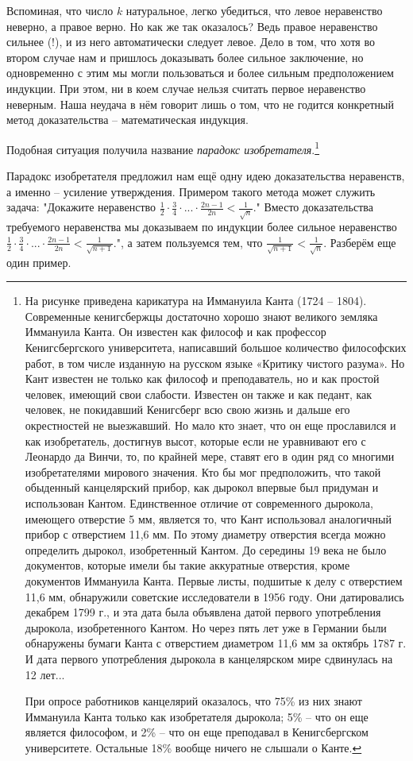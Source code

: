 Вспоминая, что число $k$ натуральное, легко убедиться, что левое неравенство неверно, а правое верно. Но как же так оказалось? Ведь правое неравенство сильнее (!), и из него автоматически следует левое. Дело в том, что хотя во втором случае нам и пришлось доказывать более сильное заключение, но одновременно с этим мы могли пользоваться и более сильным предположением индукции. При этом, ни в коем случае нельзя считать первое неравенство неверным. Наша неудача в нём говорит лишь о том, что не годится конкретный метод доказательства – математическая индукция. 
\par
Подобная ситуация получила название \textit{парадокс изобретателя}.\footnote{На рисунке приведена карикатура на Иммануила Канта (1724 – 1804). Современные кенигсбержцы достаточно хорошо знают великого земляка Иммануила Канта. Он известен как философ и как профессор Кенигсбергского университета, написавший большое количество философских работ, в том числе изданную на русском языке «Критику чистого разума».
Но Кант известен не только как философ и преподаватель, но и как простой человек, имеющий свои слабости. Известен он также и как педант, как человек, не покидавший Кенигсберг всю свою жизнь и дальше его окрестностей не выезжавший. Но мало кто знает, что он еще прославился и как изобретатель, достигнув высот, которые если не уравнивают его с Леонардо да Винчи, то, по крайней мере, ставят его в один ряд со многими изобретателями мирового значения. Кто бы мог предположить, что такой обыденный канцелярский прибор, как дырокол впервые был придуман и использован Кантом. Единственное отличие от современного дырокола, имеющего отверстие 5 мм, является то, что Кант использовал аналогичный прибор с отверстием 11,6 мм. По этому диаметру отверстия всегда можно определить дырокол, изобретенный Кантом. До середины 19 века не было документов, которые имели бы такие аккуратные отверстия, кроме документов Иммануила Канта. Первые листы, подшитые к делу с отверстием 11,6 мм, обнаружили советские исследователи в 1956 году. Они датировались декабрем 1799 г., и эта дата была объявлена датой первого употребления дырокола, изобретенного Кантом. Но через пять лет уже в Германии были обнаружены бумаги Канта с отверстием диаметром 11,6 мм за октябрь 1787 г. И дата первого употребления дырокола в канцелярском мире сдвинулась на 12 лет...
\par
При опросе работников канцелярий оказалось, что 75\% из них знают Иммануила Канта только как изобретателя дырокола; 5\% – что он еще является философом, и 2\% – что он еще преподавал в Кенигсбергском университете. Остальные 18\% вообще ничего не слышали о Канте. \smiley}

\par
Парадокс изобретателя предложил нам ещё одну идею доказательства неравенств, а именно – усиление утверждения. Примером такого метода может служить задача: "Докажите неравенство $\frac{1}{2} \cdot \frac{3}{4} \cdot ... \cdot \frac{2n - 1}{2n} < \frac{1}{\sqrt{n}}$." Вместо доказательства требуемого неравенства мы доказываем по индукции более сильное неравенство $\frac{1}{2} \cdot \frac{3}{4} \cdot ... \cdot \frac{2n - 1}{2n} < \frac{1}{\sqrt{n + 1}}$.", а затем пользуемся тем, что $\frac{1}{\sqrt{n+1}} < \frac{1}{\sqrt{n}}$. Разберём еще один пример.